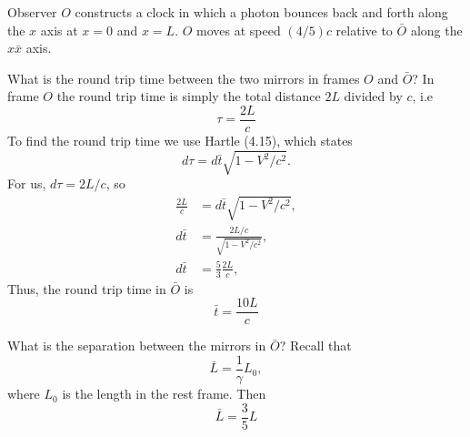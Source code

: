 \documentclass[11pt,largemargins]{homework}
\begin{document}
\question
Observer $O$ constructs a clock in which a photon bounces back and forth along the $x$ axis at $x = 0$ and $x = L$. $O$ moves at speed $(4/5)c$ relative to $\bar{O}$ along the $x \bar{x}$ axis. 
\begin{alphaparts}

\questionpart
What is the round trip time between the two mirrors in frames $O$ and $\bar{O}$?
In frame $O$ the round trip time is simply the total distance $2L$ divided by $c$, i.e
\begin{equation}
\tau = \frac{2L}{c}
\end{equation}
To find the round trip time we use Hartle (4.15), which states
\begin{equation}
d\tau = d\bar{t} \sqrt{1 - V^2 / c^2}.
\end{equation}
For us, $d\tau = 2L/c$, so
\begin{subequations}
\begin{align*}
\frac{2L}{c} &= d\bar{t} \sqrt{1 - V^2 / c^2}, \\
d\bar{t} &= \frac{2L/c}{\sqrt{1 - V^2 / c^2}}, \\
d\bar{t} &= \frac{5}{3} \frac{2L}{c},
\end{align*}
\end{subequations}
Thus, the round trip time in $\bar{O}$ is
\begin{equation}
\bar{t} = \frac{10L}{c}
\end{equation}

\questionpart
What is the separation between the mirrors in $\bar{O}$?
Recall that 
\begin{equation}
\bar{L} = \frac{1}{\gamma} L_{0},
\end{equation}
where $L_{0}$ is the length in the rest frame.
Then
\begin{equation}
\bar{L} = \frac{3}{5} L
\end{equation}

\end{alphaparts}
	
\end{document}
